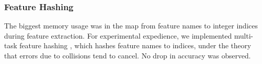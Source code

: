 \documentclass[11pt]{article}
\newcommand{\bocomment}[1]{\textcolor{Bittersweet}{[#1 -BTO]}}
\newcommand{\sam}[1]{\textcolor{blue}{[#1 -SMT]}}
\renewcommand{\bocomment}[1]{}
\renewcommand{\sam}[1]{}
\newcommand{\codenote}[1]{}
\begin{document}
\subsubsection{Feature Hashing}

  The biggest memory usage was in the map from
  feature names to integer indices during feature extraction.
  For experimental expedience, we
  implemented multi-task feature hashing
  \citep{weinberger_feature_2009}, which hashes feature names to indices, under
  the theory that errors due to collisions tend to cancel.  No
  drop in accuracy was observed.


\end{document}
